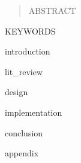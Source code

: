 \documentclass[
  conference, 
]{IEEEtran}
\begin{document}
\begin{abstract}
  ABSTRACT
\end{abstract}

\begin{IEEEkeywords}
KEYWORDS
\end{IEEEkeywords}

{introduction}

{lit_review}

{design}

{implementation}

{conclusion}

\newpage
\printbibliography

\appendix
{appendix}
\end{document}
